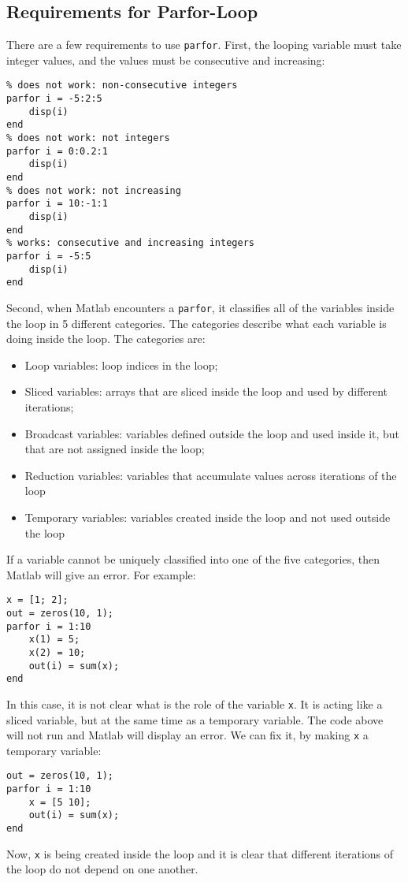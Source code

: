 \documentclass[12pt, a4paper]{article}
\begin{document}
\subsection{Requirements for Parfor-Loop}
\label{sec:orgeb794ca}
There are a few requirements to use \texttt{parfor}.
First, the looping variable must take integer values, and the values must be consecutive and increasing:
\lstset{language=matlab,label= ,caption= ,captionpos=b,firstnumber=1,numbers=left,style=Matlab-editor}
\begin{lstlisting}
% does not work: non-consecutive integers
parfor i = -5:2:5
    disp(i)
end
% does not work: not integers
parfor i = 0:0.2:1
    disp(i)
end
% does not work: not increasing
parfor i = 10:-1:1
    disp(i)
end
% works: consecutive and increasing integers
parfor i = -5:5
    disp(i)
end
\end{lstlisting}
Second, when Matlab encounters a \texttt{parfor}, it classifies all of the variables inside the loop in 5 different categories.
The categories describe what each variable is doing inside the loop.
The categories are:
\begin{itemize}
\item Loop variables: loop indices in the loop;
\item Sliced variables: arrays that are sliced inside the loop and used by different iterations;
\item Broadcast variables: variables defined outside the loop and used inside it, but that are not assigned inside the loop;
\item Reduction variables: variables that accumulate values across iterations of the loop
\item Temporary variables: variables created inside the loop and not used outside the loop
\end{itemize}
If a variable cannot be uniquely classified into one of the five categories, then Matlab will give an error.
For example:
\lstset{language=matlab,label= ,caption= ,captionpos=b,firstnumber=1,numbers=left,style=Matlab-editor}
\begin{lstlisting}
x = [1; 2];
out = zeros(10, 1);
parfor i = 1:10
    x(1) = 5;
    x(2) = 10;
    out(i) = sum(x);
end
\end{lstlisting}
In this case, it is not clear what is the role of the variable \texttt{x}.
It is acting like a sliced variable, but at the same time as a temporary variable.
The code above will not run and Matlab will display an error.
We can fix it, by making \texttt{x} a temporary variable:
\lstset{language=matlab,label= ,caption= ,captionpos=b,firstnumber=1,numbers=left,style=Matlab-editor}
\begin{lstlisting}
out = zeros(10, 1);
parfor i = 1:10
    x = [5 10];
    out(i) = sum(x);
end
\end{lstlisting}
Now, \texttt{x} is being created inside the loop and it is clear that different iterations of the loop do not depend on one another.
\end{document}
